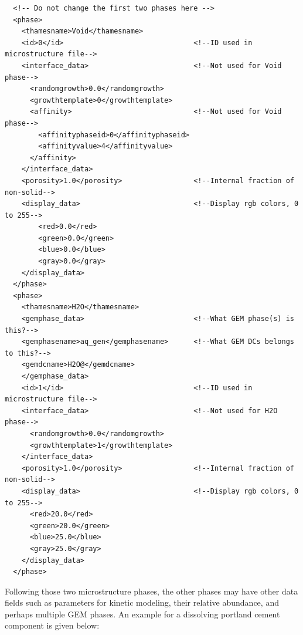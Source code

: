 \documentclass{article}
\begin{document}
\scriptsize{
    \begin{lstlisting}
  <!-- Do not change the first two phases here -->
  <phase>
    <thamesname>Void</thamesname>
    <id>0</id>                               <!--ID used in microstructure file-->
    <interface_data>                         <!--Not used for Void phase-->
      <randomgrowth>0.0</randomgrowth>       
      <growthtemplate>0</growthtemplate>
      <affinity>                             <!--Not used for Void phase-->
        <affinityphaseid>0</affinityphaseid>
        <affinityvalue>4</affinityvalue>
      </affinity>
    </interface_data>
    <porosity>1.0</porosity>                 <!--Internal fraction of non-solid-->
    <display_data>                           <!--Display rgb colors, 0 to 255-->
        <red>0.0</red>
        <green>0.0</green>
        <blue>0.0</blue>
        <gray>0.0</gray>
    </display_data>
  </phase>
  <phase>
    <thamesname>H2O</thamesname>             
    <gemphase_data>                          <!--What GEM phase(s) is this?-->
    <gemphasename>aq_gen</gemphasename>      <!--What GEM DCs belongs to this?-->
    <gemdcname>H2O@</gemdcname>
    </gemphase_data>
    <id>1</id>                               <!--ID used in microstructure file-->
    <interface_data>                         <!--Not used for H2O phase-->
      <randomgrowth>0.0</randomgrowth>
      <growthtemplate>1</growthtemplate>
    </interface_data>
    <porosity>1.0</porosity>                 <!--Internal fraction of non-solid-->
    <display_data>                           <!--Display rgb colors, 0 to 255-->
      <red>20.0</red>
      <green>20.0</green>
      <blue>25.0</blue>
      <gray>25.0</gray>
    </display_data>
  </phase>
    \end{lstlisting}
}

\normalsize{ }
Following those two microstructure phases, the other phases may have other data fields
such as parameters for kinetic modeling, their relative abundance, and perhaps
multiple GEM phases.  An example for a dissolving portland cement component is
given below:
\end{document}

